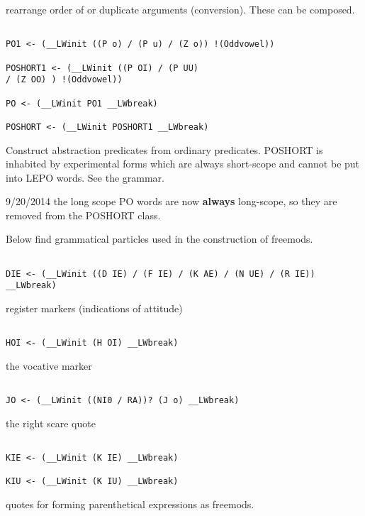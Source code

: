 \documentclass[12pt]{article}
\begin{document}
rearrange order of or duplicate arguments (conversion).  These can be composed.

\begin{verbatim}

PO1 <- (__LWinit ((P o) / (P u) / (Z o)) !(Oddvowel))

POSHORT1 <- (__LWinit ((P OI) / (P UU) 
/ (Z OO) ) !(Oddvowel))

PO <- (__LWinit PO1 __LWbreak)

POSHORT <- (__LWinit POSHORT1 __LWbreak)

\end{verbatim}

Construct abstraction predicates from ordinary predicates.  POSHORT is inhabited by experimental forms
which are always short-scope and cannot be put into LEPO words.  See the grammar.

9/20/2014 the long scope PO words are now {\bf always} long-scope, so they are removed from the POSHORT class.

Below find grammatical particles used in the construction of freemods.

\begin{verbatim}

DIE <- (__LWinit ((D IE) / (F IE) / (K AE) / (N UE) / (R IE)) __LWbreak)

\end{verbatim}

register markers (indications of attitude)

\begin{verbatim}

HOI <- (__LWinit (H OI) __LWbreak)

\end{verbatim}

the vocative marker

\begin{verbatim}

JO <- (__LWinit ((NI0 / RA))? (J o) __LWbreak)

\end{verbatim}

the right scare quote

\begin{verbatim}

KIE <- (__LWinit (K IE) __LWbreak)

KIU <- (__LWinit (K IU) __LWbreak)

\end{verbatim}

quotes for forming parenthetical expressions as freemods.
\end{document}
